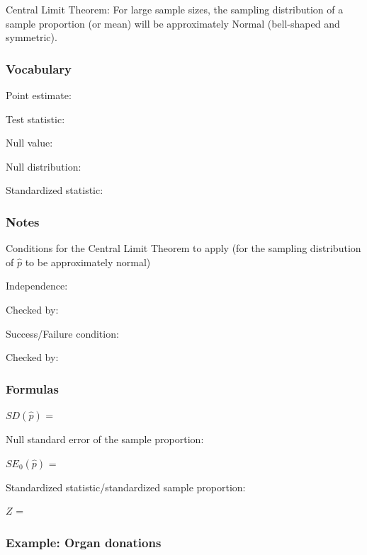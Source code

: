 \documentclass[
]{report}
\newcommand{\rgs}{\vspace{12pt}} %
\newcommand{\rgi}{\hspace{24pt}}  %
\begin{document}
Central Limit Theorem: For large sample sizes, the sampling distribution of a sample proportion (or mean) will be approximately Normal (bell-shaped and symmetric).

\hypertarget{vocabulary-12}{%
\subsubsection*{Vocabulary}\label{vocabulary-12}}

Point estimate:
\rgs

Test statistic:
\rgs

Null value:
\rgs

Null distribution:
\rgs

Standardized statistic:
\rgs

\hypertarget{notes-17}{%
\subsubsection*{Notes}\label{notes-17}}

Conditions for the Central Limit Theorem to apply (for the sampling distribution of \(\hat{p}\) to be approximately normal)

\rgi Independence:
\rgs

\rgi \rgi Checked by:
\rgs

\rgi Success/Failure condition:
\rgs

\rgi \rgi Checked by:
\rgs

\hypertarget{formulas-2}{%
\subsubsection*{Formulas}\label{formulas-2}}

\(SD(\hat{p})\) =
\rgs

Null standard error of the sample proportion:

\(SE_0(\hat{p})\) =
\rgs

Standardized statistic/standardized sample proportion:

\(Z\) =
\rgs

\hypertarget{example-organ-donations}{%
\subsubsection*{Example: Organ donations}\label{example-organ-donations}}
\end{document}
